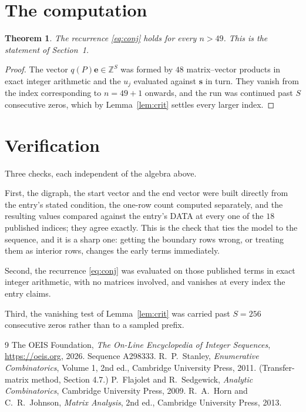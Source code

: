 \documentclass[11pt,a4paper]{article}
\theoremstyle{plain}
\newtheorem{theorem}{Theorem}
\theoremstyle{definition}
\begin{document}
\section{The computation}

\begin{theorem}
The recurrence \eqref{eq:conj} holds for every $n>49$. This is the statement of
Section~1.
\end{theorem}

\begin{proof}
The vector $q(P)\mathbf{e}\in\mathbb{Z}^{S}$ was formed by $48$ matrix--vector
products in exact integer arithmetic and the $u_j$ evaluated against $\mathbf{s}$ in turn.
They vanish from the index corresponding to $n=49+1$ onwards, and the run was continued
past $S$ consecutive zeros, which by Lemma~\ref{lem:crit} settles every larger index.
\end{proof}

\section{Verification}

Three checks, each independent of the algebra above.

First, the digraph, the start vector and the end vector were built directly from the
entry's stated condition, the one-row count computed separately, and the resulting values
compared against the entry's DATA at every one of the $18$ published indices; they
agree exactly. This is the check that ties the model to the sequence, and it is a sharp one:
getting the boundary rows wrong, or treating them as interior rows, changes the early terms
immediately.

Second, the recurrence \eqref{eq:conj} was evaluated on those published terms in exact
integer arithmetic, with no matrices involved, and vanishes at every index the entry claims.

Third, the vanishing test of Lemma~\ref{lem:crit} was carried past $S=256$ consecutive
zeros rather than to a sampled prefix.

\begin{thebibliography}{9}
 The OEIS Foundation, \emph{The On-Line Encyclopedia of Integer
Sequences}, \url{https://oeis.org}, 2026. Sequence A298333.
 R.~P.~Stanley, \emph{Enumerative Combinatorics}, Volume 1, 2nd ed.,
Cambridge University Press, 2011. (Transfer-matrix method, Section 4.7.)
 P.~Flajolet and R.~Sedgewick, \emph{Analytic Combinatorics}, Cambridge
University Press, 2009.
 R.~A.~Horn and C.~R.~Johnson, \emph{Matrix Analysis}, 2nd ed., Cambridge
University Press, 2013.
\end{thebibliography}
\end{document}
